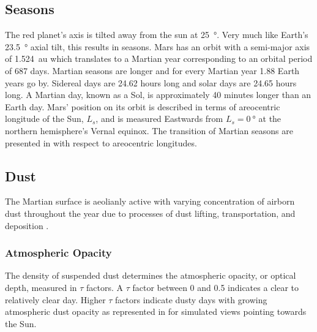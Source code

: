 %

\subsection{Seasons}
\label{sec:MartianEnvironment:Seasons}
The red planet's axis is tilted away from the sun at \SI{25}{\degree}. Very much like Earth's \SI{23.5}{\degree} axial tilt, this results in seasons. Mars has an orbit with a semi-major axis of \SI{1.524}{\astronomicalunit} which translates to a Martian year corresponding to an orbital period of 687 days. Martian seasons are longer and for every Martian year 1.88 Earth years go by. Sidereal days are 24.62 hours long and solar days are 24.65 hours long. A Martian day, known as a Sol, is approximately 40 minutes longer than an Earth day. Mars' position on its orbit is described in terms of areocentric longitude of the Sun, $L_{s}$, and is measured Eastwards from $L_{s} = \SI{0}{\degree}$ at the northern hemisphere's Vernal equinox. The transition of Martian seasons are presented in  with respect to areocentric longitudes.




\subsection{Dust}
\label{sec:MartianEnvironment:Dust}
The Martian surface is aeolianly active with varying concentration of airborn dust throughout the year due to processes of dust lifting, transportation, and deposition .


\subsubsection{Atmospheric Opacity}
\label{sec:MartianEnvironment:Dust:AtmosphericOpacity}
The density of suspended dust determines the atmospheric opacity, or optical depth, measured in $\tau$ factors. A $\tau$ factor between 0 and 0.5 indicates a clear to relatively clear day. Higher $\tau$ factors indicate dusty days with growing atmospheric dust opacity as represented in  for simulated views pointing towards the Sun. %


